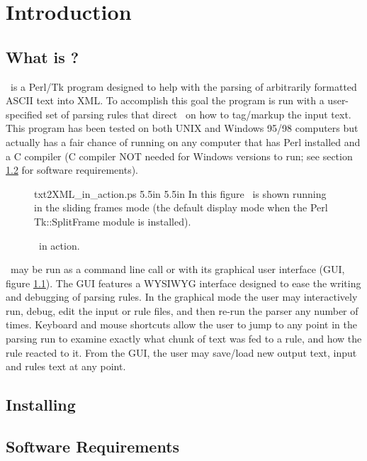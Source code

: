 
\chapter{Introduction}
\label{introduction}

\section{What is \program ?}

\program\ is a Perl/Tk program designed to help with the parsing of arbitrarily
formatted ASCII text into XML. To accomplish this goal the
program is run with a user-specified set of parsing rules that direct
\program\ on how to tag/markup the input text.
This program has been tested on both UNIX and Windows 95/98 computers
but actually has a fair chance of running on any computer that has
Perl installed and a C compiler (C compiler NOT needed for Windows 
versions to run; see section \ref{sec:installing} for software requirements).

\begin{figure}
\caption{\program\ in action.}
\label{fig:txt2XML_in_action}
 \mongovarybothside txt2XML_in_action.ps 5.5in 5.5in
In this figure \program\ is shown running in the sliding frames mode
(the default display mode when the Perl Tk::SplitFrame module is 
installed).
\end{figure}

\program\ may be run as a command line call or with its graphical user
interface (GUI, figure \ref{fig:txt2XML_in_action}). 
The GUI features a WYSIWYG interface designed to ease the 
writing and debugging of parsing rules. In the graphical mode the user may 
interactively run, debug, edit the input or rule files, and then re-run 
the parser any number of times. 
Keyboard and mouse shortcuts allow the user to jump to any point in
the parsing run to examine exactly what chunk of text was fed to a 
rule, and how the rule reacted to it. 
From the GUI, the user may save/load new output text, input and rules text 
at any point. 
 
\section{Installing \program }
\label{sec:installing}

\section{Software Requirements}

